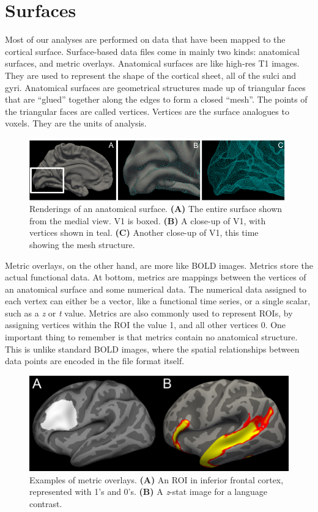 \documentclass[letterpaper,10pt,openany,oneside]{sphinxmanual}
\begin{document}
\section{Surfaces}
\label{surface_reconstruction:surfaces}
Most of our analyses are performed on data that have been mapped to the
cortical surface. Surface-based data files come in mainly two kinds: anatomical
surfaces, and metric overlays. Anatomical surfaces are like high-res T1 images.
They are used to represent the shape of the cortical sheet, all of the sulci
and gyri. Anatomical surfaces are geometrical structures made up of triangular
faces that are ``glued'' together along the edges to form a closed ``mesh''. The
points of the triangular faces are called vertices. Vertices are the surface
analogues to voxels. They are the units of analysis.
\begin{figure}[htbp]
\centering
\capstart

\includegraphics{surf_mesh_01.pdf}
\caption{Renderings of an anatomical surface. \textbf{(A)} The entire surface shown from
the medial view. V1 is boxed. \textbf{(B)} A close-up of V1, with vertices shown
in teal. \textbf{(C)} Another close-up of V1, this time showing the mesh structure.}\end{figure}

Metric overlays, on the other hand, are more like BOLD images. Metrics store
the actual functional data. At bottom, metrics are mappings between the
vertices of an anatomical surface and some numerical data. The numerical data
assigned to each vertex can either be a vector, like a functional time series,
or a single scalar, such as a \emph{z} or \emph{t} value. Metrics are also commonly used
to represent ROIs, by assigning vertices within the ROI the value 1, and all
other vertices 0. One important thing to remember is that metrics contain no
anatomical structure. This is unlike standard BOLD images, where the spatial
relationships between data points are encoded in the file format itself.
\begin{figure}[htbp]
\centering
\capstart

\includegraphics{metrics_01.pdf}
\caption{Examples of metric overlays. \textbf{(A)} An ROI in inferior frontal cortex,
represented with 1's and 0's. \textbf{(B)} A \emph{z}-stat image for a language contrast.}\end{figure}
\end{document}

